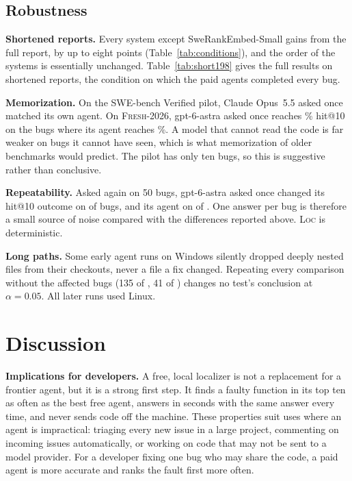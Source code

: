 \documentclass[acmsmall,screen,review,anonymous]{acmart}
\newcommand{\tool}{\textsc{Loc}\xspace}
\newcommand{\tool}{Allfather\xspace}
\newcommand{\fresh}{\textsc{Fresh-2026}\xspace}
\begin{document}
\subsection{Robustness}
\label{sec:robustness}



\textbf{Shortened reports.} Every system except SweRankEmbed-Small gains from the full report, by up to eight points (Table~\ref{tab:conditions}), and the order of the systems is essentially unchanged. Table~\ref{tab:short198} gives the full results on shortened reports, the condition on which the paid agents completed every bug.



\textbf{Memorization.} On the SWE-bench Verified pilot, Claude Opus~5.5 asked once matched its own agent. On \fresh, gpt-6-astra asked once reaches \AstraSingleShort\% hit@10 on the bugs where its agent reaches \AstraAgentShort\%. A model that cannot read the code is far weaker on bugs it cannot have seen, which is what memorization of older benchmarks would predict. The pilot has only ten bugs, so this is suggestive rather than conclusive.

\textbf{Repeatability.} Asked again on 50 bugs, gpt-6-astra asked once changed its hit@10 outcome on \RepeatSingleChanged{} of \RepeatSingleN{} bugs, and its agent on \RepeatAgentChanged{} of \RepeatAgentN{}. One answer per bug is therefore a small source of noise compared with the differences reported above. \tool is deterministic.

\textbf{Long paths.} Some early agent runs on Windows silently dropped deeply nested files from their checkouts, never a file a fix changed. Repeating every comparison without the affected bugs (135 of \NBugs{}, 41 of \NAgent{}) changes no test's conclusion at $\alpha=0.05$. All later runs used Linux.

\section{Discussion}
\label{sec:discussion}

\textbf{Implications for developers.} A free, local localizer is not a replacement for a frontier agent, but it is a strong first step. It finds a faulty function in its top ten as often as the best free agent, answers in seconds with the same answer every time, and never sends code off the machine. These properties suit uses where an agent is impractical: triaging every new issue in a large project, commenting on incoming issues automatically, or working on code that may not be sent to a model provider. For a developer fixing one bug who may share the code, a paid agent is more accurate and ranks the fault first more often.
\end{document}
